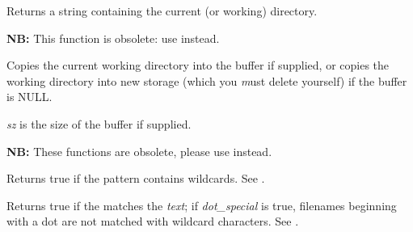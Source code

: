 \label{wxgetcwd}


Returns a string containing the current (or working) directory.


\label{wxgetworkingdirectory}


{\bf NB:} This function is obsolete: use  instead.

Copies the current working directory into the buffer if supplied, or
copies the working directory into new storage (which you {\emph must} delete
yourself) if the buffer is NULL.

{\it sz} is the size of the buffer if supplied.


\label{wxgettempfilename}




{\bf NB:} These functions are obsolete, please use\rtfsp
{}\rtfsp
instead.


\label{wxiswild}


Returns true if the pattern contains wildcards. See .


\label{wxmatchwild}


Returns true if the \/ matches the {\it text}\/; if {\it
dot\_special}\/ is true, filenames beginning with a dot are not matched
with wildcard characters. See .



